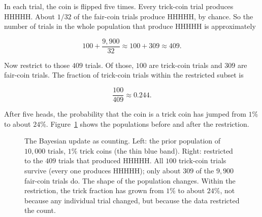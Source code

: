 In each trial, the coin is flipped five times. Every trick-coin trial produces HHHHH. About $1/32$ of the fair-coin trials produce HHHHH, by chance. So the number of trials in the whole population that produce HHHHH is approximately

$$100 + \frac{9{,}900}{32} \approx 100 + 309 \approx 409.$$

Now restrict to those $409$ trials. Of those, $100$ are trick-coin trials and $309$ are fair-coin trials. The fraction of trick-coin trials within the restricted subset is

$$\frac{100}{409} \approx 0.244.$$

After five heads, the probability that the coin is a trick coin has jumped from $1\%$ to about $24\%$. Figure~\ref{fig:coin-counting} shows the populations before and after the restriction.

\begin{figure}[h]
\centering
{}
\caption{The Bayesian update as counting. Left: the prior population of $10{,}000$ trials, $1\%$ trick coins (the thin blue band). Right: restricted to the $409$ trials that produced HHHHH. All $100$ trick-coin trials survive (every one produces HHHHH); only about $309$ of the $9{,}900$ fair-coin trials do. The shape of the population changes. Within the restriction, the trick fraction has grown from $1\%$ to about $24\%$, not because any individual trial changed, but because the data restricted the count.}
\label{fig:coin-counting}
\end{figure}

